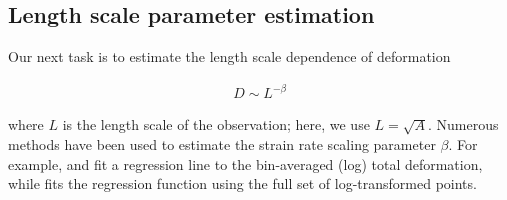 \documentclass[aog]{igs}
\begin{document}
\subsection{Length scale parameter estimation}
Our next task is to estimate the length scale dependence of deformation 
\begin{linenomath*}
\begin{align}
    D \sim L^{-\beta} 
\end{align}
\end{linenomath*}
where $L$ is the length scale of the observation; here, we use $L = \sqrt{A}$.
Numerous methods have been used to estimate the strain rate scaling parameter $\beta$.
For example, \cite{Marsan2004} and \cite{Hutchings2011} fit a regression line to the bin-averaged (log) total deformation, while \cite{itkin2017_ThinIce} fits the regression function using the full set of log-transformed points.
\end{document}

